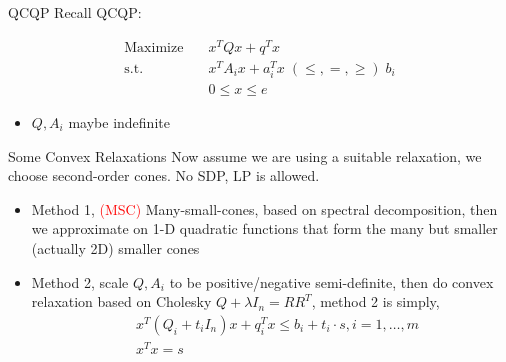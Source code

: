 

\usepackage{subfig}
\usepackage[style=authoryear]{biblatex}
\usepackage{bm}

\date{\today}




\fontsize{9pt}{11}\selectfont
\frame{\titlepage}
\begin{frame}{QCQP}
  Recall QCQP:

  \begin{equation}
    \begin{aligned}
      \mathrm{Maximize}\quad & x^TQx + q^T x                                   \\
      \mathrm{s.t.}  \quad   & x^{T} A_i x  + a_i^Tx   \; (\le, =, \ge) \; b_i \\
                             & 0\le x\le e
    \end{aligned}
  \end{equation}

  \begin{itemize}
    \item \(Q, A_i\) maybe indefinite
  \end{itemize}
\end{frame}
\begin{frame}{Some Convex Relaxations}
  Now assume we are using a suitable relaxation, we choose second-order cones. No SDP, LP is allowed.
  \begin{itemize}
    \item Method 1, \textcolor{red}{(MSC)} Many-small-cones, based on spectral decomposition, then we approximate on 1-D quadratic functions that form the many but smaller (actually 2D) smaller cones
    \item Method 2, scale \(Q, A_i\) to be positive/negative semi-definite, then do convex relaxation based on Cholesky \(Q +\lambda I_n = RR^T\), method 2 is simply,
          \begin{equation}\label{eq:primal.Sigma}
            \begin{aligned}
               & x^T(Q_i+t_i I_n) x+q_i^T x \leqslant b_i+ t_i \cdot s,i= 1,\dots, m \\
               & x^T x= s
            \end{aligned}
          \end{equation}
  \end{itemize}
\end{frame}
